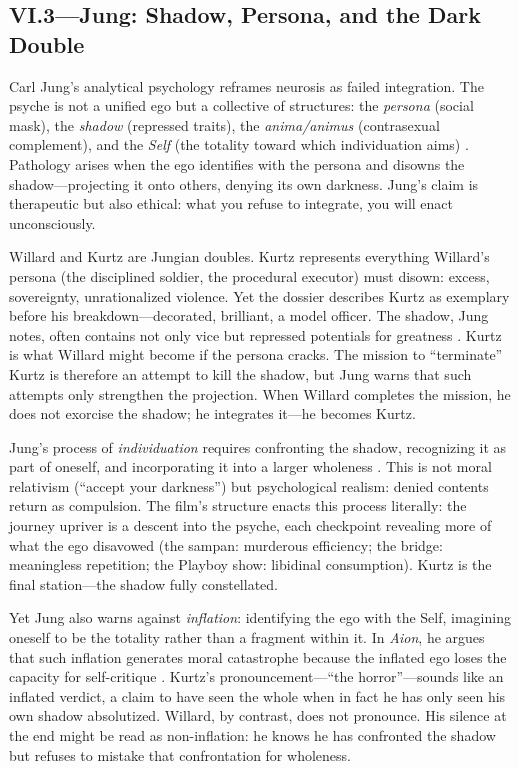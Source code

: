 \subsection*{VI.3—Jung: Shadow, Persona, and the Dark Double}
\label{ssec:vi-jung}

Carl Jung's analytical psychology reframes neurosis as failed integration. The psyche is not a 
unified ego but a collective of structures: the \emph{persona} (social mask), the 
\emph{shadow} (repressed traits), the \emph{anima/animus} (contrasexual complement), and the 
\emph{Self} (the totality toward which individuation aims) \parencite{JungArchetypes1969}. 
Pathology arises when the ego identifies with the persona and disowns the shadow---projecting 
it onto others, denying its own darkness. Jung's claim is therapeutic but also ethical: what 
you refuse to integrate, you will enact unconsciously.

Willard and Kurtz are Jungian doubles. Kurtz represents everything Willard's persona (the 
disciplined soldier, the procedural executor) must disown: excess, sovereignty, 
unrationalized violence. Yet the dossier describes Kurtz as exemplary before his 
breakdown---decorated, brilliant, a model officer. The shadow, Jung notes, often contains not 
only vice but repressed potentials for greatness \parencite{JungArchetypes1969}. Kurtz is what 
Willard might become if the persona cracks. The mission to ``terminate'' Kurtz is therefore an 
attempt to kill the shadow, but Jung warns that such attempts only strengthen the projection. 
When Willard completes the mission, he does not exorcise the shadow; he integrates it---he 
becomes Kurtz.

Jung's process of \emph{individuation} requires confronting the shadow, recognizing it as part 
of oneself, and incorporating it into a larger wholeness \parencite{JungArchetypes1969}. This 
is not moral relativism (``accept your darkness'') but psychological realism: denied contents 
return as compulsion. The film's structure enacts this process literally: the journey upriver 
is a descent into the psyche, each checkpoint revealing more of what the ego disavowed (the 
sampan: murderous efficiency; the bridge: meaningless repetition; the Playboy show: libidinal 
consumption). Kurtz is the final station---the shadow fully constellated.

Yet Jung also warns against \emph{inflation}: identifying the ego with the Self, imagining 
oneself to be the totality rather than a fragment within it. In \textit{Aion}, he argues that 
such inflation generates moral catastrophe because the inflated ego loses the capacity for 
self-critique \parencite{JungAion1969}. Kurtz's pronouncement---``the horror''---sounds like 
an inflated verdict, a claim to have seen the whole when in fact he has only seen his own 
shadow absolutized. Willard, by contrast, does not pronounce. His silence at the end might be 
read as non-inflation: he knows he has confronted the shadow but refuses to mistake that 
confrontation for wholeness.

